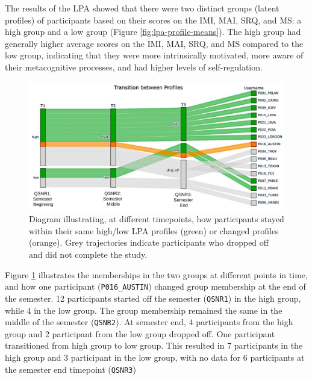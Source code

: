 \documentclass[letterpaper, nobind]{templates/ociamthesis}
\begin{document}
The results of the LPA showed that there were two distinct groups (latent profiles) of participants based on their scores on the IMI, MAI, SRQ, and MS: a high group and a low group (Figure \ref{fig:lpa-profile-means}). The high group had generally higher average scores on the IMI, MAI, SRQ, and MS compared to the low group, indicating that they were more intrinsically motivated, more aware of their metacognitive processes, and had higher levels of self-regulation.

\begin{figure}

{\centering \includegraphics[width=1\linewidth]{figs/lpa-profile-transitions} 

}

\caption[LPA Profile Transitions.]{Diagram illustrating, at different timepoints, how participants stayed within their same high/low LPA profiles (green) or changed profiles (orange). Grey trajectories indicate participants who dropped off and did not complete the study.}\label{fig:lpa-profile-transitions}
\end{figure}





Figure \ref{fig:lpa-profile-transitions} illustrates the memberships in the two groups at different points in time, and how one participant (\texttt{P016\_AUSTIN}) changed group membership at the end of the semester.
12 participants started off the semester (\texttt{QSNR1}) in the high group, while 4 in the low group.
The group membership remained the same in the middle of the semester (\texttt{QSNR2}).
At semester end, 4 participants from the high group and 2 participant from the low group dropped off.
One participant transitioned from high group to low group.
This resulted in 7 participants in the high group and 3 participant in the low group, with no data for 6 participants at the semester end timepoint (\texttt{QSNR3})
\end{document}
